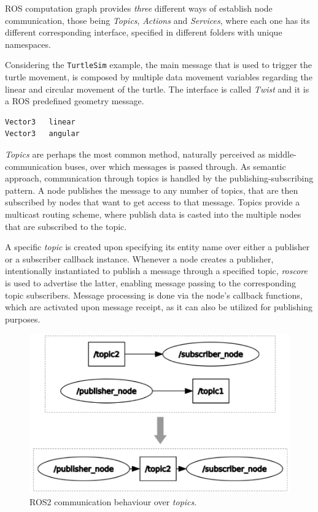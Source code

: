 ROS computation graph provides \textit{three} different ways of establish node communication, those being \textit{Topics}, \textit{Actions} and \textit{Services}, where each one has its different corresponding interface, specified in different folders with unique namespaces. 

Considering the \texttt{TurtleSim} example, the main message that is used to trigger the turtle movement, is composed by multiple data movement variables regarding the linear and circular movement of the turtle. The interface is called \textit{Twist} and it is a ROS predefined geometry message.

\begin{lstlisting}[title={\texttt{Twist.msg} interface file that is used to trigger the turtle movement.}]
Vector3   linear
Vector3   angular
\end{lstlisting}

\textit{Topics} are perhaps the most common method, naturally perceived as middle-communication buses, over which messages is passed through. As semantic approach, communication through topics is handled by the publishing-subscribing pattern. A node publishes the message to any number of topics, that are then subscribed by nodes that want to get access to that message. Topics provide a multicast routing scheme, where publish data is casted into the multiple nodes that are subscribed to the topic. 

A specific \textit{topic} is created upon specifying its entity name over either a publisher or a subscriber callback instance. Whenever a node creates a publisher, intentionally instantiated to publish a message through a specified topic, \textit{roscore} is used to advertise the latter, enabling message passing to the corresponding topic subscribers. Message processing is done via the node's callback functions, which are activated upon message receipt, as it can also be utilized for publishing purposes. \cite{casini2019response} %

\begin{figure}[H]
        \centering
        \includegraphics[width=0.4\linewidth]{images/ros2-topics.png}
        \caption{ROS2 communication behaviour over \textit{topics}.}
        \label{fig:ros2-topics}
\end{figure}

